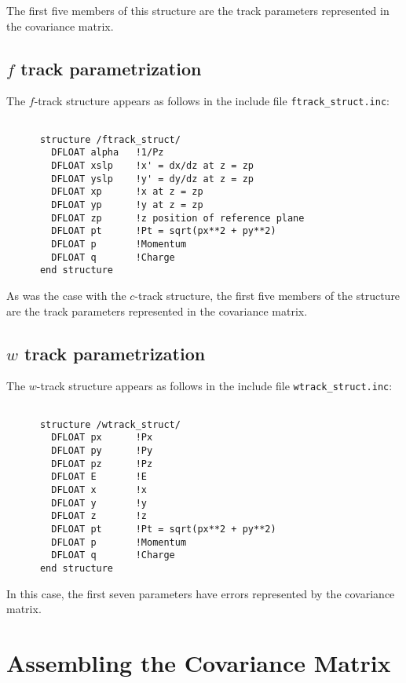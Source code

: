 The first five members of this structure are the track parameters
represented in the covariance matrix.

\subsection{$f$ track parametrization}

The $f$-track structure appears as follows in the include file
\verb'ftrack_struct.inc': 

\begin{verbatim}

      structure /ftrack_struct/
        DFLOAT alpha   !1/Pz
        DFLOAT xslp    !x' = dx/dz at z = zp
        DFLOAT yslp    !y' = dy/dz at z = zp
        DFLOAT xp      !x at z = zp
        DFLOAT yp      !y at z = zp
        DFLOAT zp      !z position of reference plane
        DFLOAT pt      !Pt = sqrt(px**2 + py**2)
        DFLOAT p       !Momentum
        DFLOAT q       !Charge
      end structure

\end{verbatim}

As was the case with the $c$-track structure, the first five members of the
structure are the track parameters represented in the covariance matrix.

\subsection{$w$ track parametrization}

The $w$-track structure appears as follows in the include file
\verb'wtrack_struct.inc': 

\begin{verbatim}

      structure /wtrack_struct/
        DFLOAT px      !Px
        DFLOAT py      !Py
        DFLOAT pz      !Pz
        DFLOAT E       !E
        DFLOAT x       !x
        DFLOAT y       !y
        DFLOAT z       !z
        DFLOAT pt      !Pt = sqrt(px**2 + py**2)
        DFLOAT p       !Momentum
        DFLOAT q       !Charge
      end structure

\end{verbatim}

In this case, the first seven parameters have errors represented by the
covariance matrix.

\section{Assembling the Covariance Matrix}

